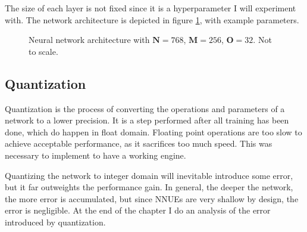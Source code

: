 The size of each layer is not fixed since it is a hyperparameter I will experiment with. The network architecture is depicted in figure \ref{fig:network}, with example parameters.

\begin{figure}[H]
\centering
{}
\caption{Neural network architecture with $\bm{N}=768$, $\bm{M}=256$, $\bm{O}=32$. Not to scale.}
\label{fig:network}
\end{figure}

\subsection{Quantization}


Quantization is the process of converting the operations and parameters of a network to a lower precision. It is a step performed after all training has been done, which do happen in float domain. Floating point operations are too slow to achieve acceptable performance, as it sacrifices too much speed. This was necessary to implement to have a working engine.

Quantizing the network to integer domain will inevitable introduce some error, but it far outweights the performance gain. In general, the deeper the network, the more error is accumulated, but since NNUEs are very shallow by design, the error is negligible. At the end of the chapter I do an analysis of the error introduced by quantization.

